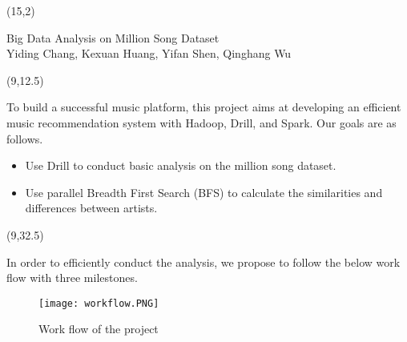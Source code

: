 \documentclass[hyperref={pdfpagelabels=false}]{beamer}
\begin{document}
\begin{frame}

%
%

\begin{textblock}{65}(15,2)
	\begin{blankbox}[fontupper=\comic\fontsize{85}{45}\selectfont,colupper=white!75,halign=center]
		Big Data Analysis on Million Song Dataset \\
		\vspace{0.5 cm}
		\huge Yiding Chang, Kexuan Huang, Yifan Shen, Qinghang Wu
	\end{blankbox}
\end{textblock}

\begin{textblock}{40}(9,12.5)
	\begin{basebox}[title=Introduction,opacitybacktitle=.45,colframe=green!65!black,colbacktitle=green!10, halign title=left]
		To build a successful music platform, this project aims at developing an efficient music recommendation system with Hadoop, Drill, and Spark. Our goals are as follows.
		\vspace{0.15 cm}
		\begin{itemize}
		\item Use Drill to conduct basic analysis on the million song dataset. 
		\item Use parallel Breadth First Search (BFS) to calculate the similarities and differences between artists.
		\end{itemize}
	\vspace{0.15 cm}
	\end{basebox}
\end{textblock}

\begin{textblock}{40}(9,32.5)
	\begin{basebox}[title=Proposed Work Flow,opacitybacktitle=.45,colbacktitle=green!10,colframe=green!65!black, halign title=left]
		In order to efficiently conduct the analysis, we propose to follow the below work flow with three milestones. 
		\vspace{0.3 cm}
		\begin{figure}[H]
		  \center
		  \texttt{[image: workflow.PNG]}
		  \caption{Work flow of the project}
		\end{figure}
	\vspace{0.2 cm}
	\end{basebox}
\end{textblock}


\end{frame}
\end{document}

